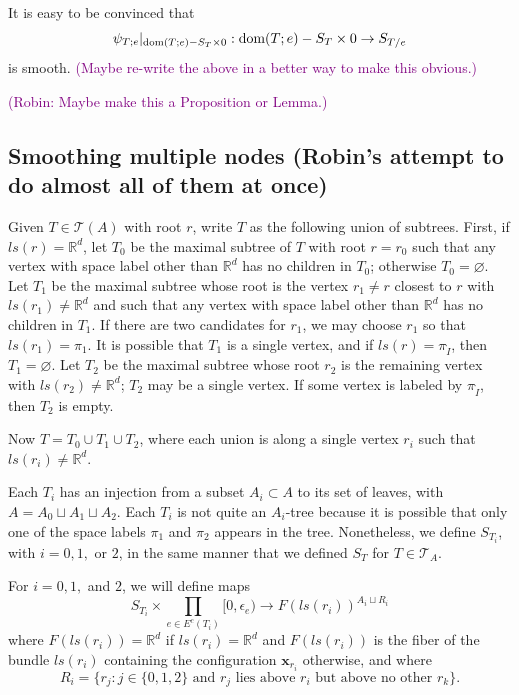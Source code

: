 \documentclass[11pt]{article}
\theoremstyle{definition}
\theoremstyle{remark}
\def\wt#1{\widetilde{#1}}
\def\R{\mathbb{R}}
\def\cT{\mathcal{T}}
\def\rI{{\mathring{I}}}
\def\bx{\mathbf{x}}
\def\cmt#1{\textcolor{purple}{(#1)}}
\def\tn#1{\textnormal{#1}}
\def\x{\!\times\!}
\begin{document}
It is easy to be convinced that  $$\psi_{T;e}|_{\tn{dom}(T;e)-S_T\times0}:\tn{dom}(T;e)-S_T\times0\to S_{T/e}$$
is smooth. 
\cmt{Maybe re-write the above in a better way to make this obvious.}

\cmt{Robin: Maybe make this a Proposition or Lemma.}

\subsection{Smoothing multiple nodes (Robin's attempt to do almost all of them at once)}

Given $T\in\cT(A)$ with root $r$, write $T$ as the following union of subtrees.  First, if $ls(r)=\R^d$, let $T_0$ be the maximal subtree of $T$ with root $r=r_0$ such that any vertex with space label other than $\R^d$ has no children in $T_0$; otherwise $T_0=\varnothing$.  
Let $T_1$ be the maximal subtree whose root is the vertex $r_1 \neq r$ closest to $r$ with $ls(r_1)\neq \R^d$ and such that any vertex with space label other than $\R^d$ has no children in $T_1$.  If there are two candidates for $r_1$, we may choose $r_1$ so that $ls(r_1)=\pi_1$.  It is possible that $T_1$ is a single vertex, and if $ls(r)=\pi_\rI$, then $T_1=\varnothing$.  
Let $T_2$ be the maximal subtree whose root $r_2$ is the remaining vertex with $ls(r_2)\neq \R^d$; $T_2$ may be a single vertex.  If some vertex is labeled by $\pi_\rI$, then $T_2$ is empty.  

Now $T=T_0\cup T_1\cup T_2$, where each union is along a single vertex $r_i$ such that $ls(r_i) \neq \R^d$.   

Each $T_i$ has an injection from a subset $A_i \subset A$ to its set of leaves, with $A=A_0 \sqcup A_1 \sqcup A_2$.
Each $T_i$ is not quite an $A_i$-tree because it is possible that only one of the space labels $\pi_1$ and $\pi_2$ appears in the tree.
Nonetheless, we define $S_{T_i}$, with $i=0,1,$ or $2$, in the same manner that we defined $S_T$ for $T\in \mathcal{T}_A$.  

For $i=0,1,$ and $2$, we will define maps
\begin{equation}
\label{eq:multiple-smoothing}
S_{T_i} \x \prod_{e \in E^c(T_i)} [0,\epsilon_e) \to F(ls(r_i))^{A_i \sqcup R_i}
\end{equation}
where $F(ls(r_i))=\R^d$ if $ls(r_i)= \R^d$ and $F(ls(r_i))$ is the fiber of the bundle $ls(r_i)$ containing the configuration $\bx_{r_i}$ otherwise, and where
\[
R_i=\{ r_j : j\in\{0,1,2\} \text{ and } r_j \text{ lies above } r_i \text{ but above no other } r_k \}.
\]
\end{document}
